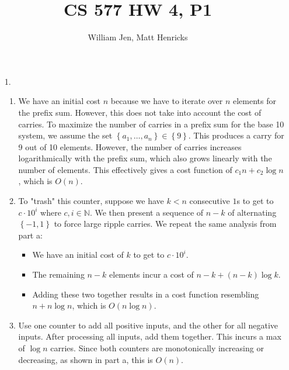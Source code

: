 \documentclass{article}
\title{CS 577 HW 4, P1}
\author{William Jen, Matt Henricks}
\date{}
\begin{document}
\maketitle

\begin{enumerate}
    \item[1.]
        \begin{enumerate}
            \item We have an initial cost $n$ because we have to iterate over $n$ elements for the prefix sum.
                However, this does not take into account the cost of carries. To maximize the number of carries
                in a prefix sum for the base 10 system, we assume the set $\left\{a_1, \ldots, a_n\right\} \in
                \left\{9\right\}$. This produces a carry for 9 out of 10 elements. However, the number of carries
                increases logarithmically with the prefix sum, which also grows linearly with the number of elements.
                This effectively gives a cost function of $c_1n + c_2\log n$, which is $O\left(n\right)$.
                
            \item To "trash" this counter, suppose we have $k < n$ consecutive $1$s to get to $c \cdot 10^i$ where $c, i 
            \in \mathbb{N}$. We then present a sequence of $n - k$ of alternating $\left\{-1, 1\right\}$ to force
            large ripple carries. We repeat the same analysis from part a:
                \begin{itemize}
                    \item We have an initial cost of $k$ to get to $c \cdot 10^i$.
                    \item The remaining $n-k$ elements incur a cost of $n-k + \left(n - k\right)\log k$.
                    \item Adding these two together results in a cost function resembling $n + n\log n$, which is
                        $O\left(n\log n\right)$.
                \end{itemize}
                
            \item Use one counter to add all positive inputs, and the other for all negative inputs.
                After processing all inputs, add them together. This incurs a max of $\log n$ carries. Since
                both counters are monotonically increasing or decreasing, as shown in part a, this is $O\left(n\right)$.
            

\end{enumerate}
\end{enumerate}
\end{document}
